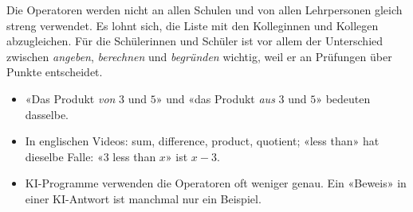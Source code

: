 \documentclass[11pt]{exam}
\begin{document}
\begin{lehrperson}[Operatoren]
Die Operatoren werden nicht an allen Schulen und von allen Lehrpersonen gleich
streng verwendet. Es lohnt sich, die Liste mit den Kolleginnen und Kollegen
abzugleichen. Für die Schülerinnen und Schüler ist vor allem der Unterschied
zwischen \emph{angeben}, \emph{berechnen} und \emph{begründen} wichtig, weil
er an Prüfungen über Punkte entscheidet.
\end{lehrperson}

\begin{schreibweisen}
\begin{itemize}
  \item «Das Produkt \emph{von} $3$ und $5$» und «das Produkt \emph{aus} $3$
        und $5$» bedeuten dasselbe.
  \item In englischen Videos: sum, difference, product, quotient; «less
        than» hat dieselbe Falle: «$3$ less than $x$» ist $x - 3$.
  \item KI-Programme verwenden die Operatoren oft weniger genau. Ein
        «Beweis» in einer KI-Antwort ist manchmal nur ein Beispiel.
\end{itemize}
\end{schreibweisen}
\end{document}
